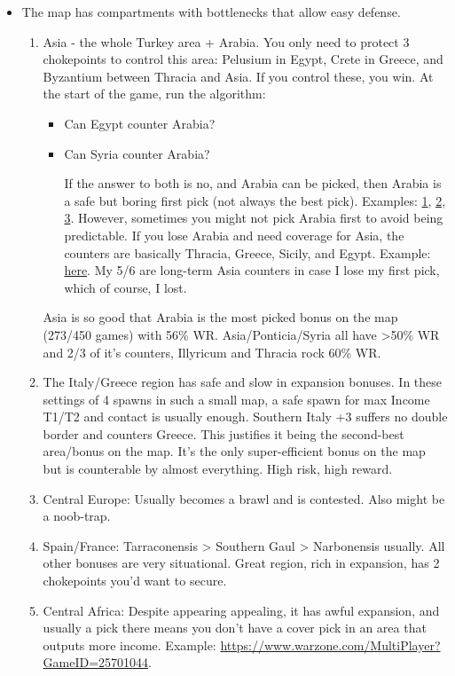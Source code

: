 \begin{itemize}
    \item The map has compartments with bottlenecks that allow easy defense.
    \begin{enumerate}
        \item Asia - the whole Turkey area + Arabia. You only need to protect 3 chokepoints to control this area: Pelusium in Egypt, Crete in Greece, and Byzantium between Thracia and Asia. If you control these, you win. At the start of the game, run the algorithm:
        \begin{itemize}
            \item Can Egypt counter Arabia?
            \item Can Syria counter Arabia?
            
            If the answer to both is no, and Arabia can be picked, then Arabia is a safe but boring first pick (not always the best pick). Examples: \href{https://www.warzone.com/MultiPlayer?GameID=36627592}{1}, \href{https://www.warzone.com/MultiPlayer?GameID=36565091}{2}, \href{https://www.warzone.com/MultiPlayer?GameID=34480255}{3}. However, sometimes you might not pick Arabia first to avoid being predictable. If you lose Arabia and need coverage for Asia, the counters are basically Thracia, Greece, Sicily, and Egypt. Example: \href{https://www.warzone.com/MultiPlayer?GameID=35593018}{here}. My 5/6 are long-term Asia counters in case I lose my first pick, which of course, I lost.
        \end{itemize}    
        Asia is so good that Arabia is the most picked bonus on the map (273/450 games) with 56\% WR. Asia/Ponticia/Syria all have >50\% WR and 2/3 of it's counters, Illyricum and Thracia rock 60\% WR.
        \item The Italy/Greece region has safe and slow in expansion bonuses. In these settings of 4 spawns in such a small map, a safe spawn for max Income T1/T2 and contact is usually enough. Southern Italy +3 suffers no double border and counters Greece. This justifies it being the second-best area/bonus on the map. It's the only super-efficient bonus on the map but is counterable by almost everything. High risk, high reward.
        \item Central Europe: Usually becomes a brawl and is contested. Also might be a noob-trap.
        \item Spain/France: Tarraconensis > Southern Gaul > Narbonensis usually. All other bonuses are very situational. Great region, rich in expansion, has 2 chokepoints you'd want to secure.
        \item Central Africa: Despite appearing appealing, it has awful expansion, and usually a pick there means you don't have a cover pick in an area that outputs more income. Example: \url{https://www.warzone.com/MultiPlayer?GameID=25701044}.
    \end{enumerate}
\end{itemize}

